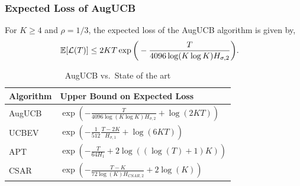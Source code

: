 \begin{frame}
\frametitle{Expected Loss of AugUCB}

\begin{theorem}
For $K\geq 4$ and $\rho={1}/{3}$,
the expected loss of the AugUCB algorithm is given by,
\begin{align*}
\mathbb{E}[\mathcal{L}(T)]
& \leq 2KT \exp\bigg(- \frac{T}{4096 \log( K\log K) H_{\sigma,2}} \bigg).
\end{align*}
\end{theorem}


\begin{table}[b]
\caption{AugUCB vs.\ State of the art}
\label{tab:regret-bds}
\begin{center}
\begin{tabular}{|p{1.5cm}|p{6.4cm}|}
\hline
Algorithm  & Upper Bound on Expected Loss \\
\hline
AugUCB      &$ \exp\left(- \frac{T}{4096 \log(K\log K)H_{\sigma,2}} + \log\left(2KT\right) \right) $ \\
\hline
UCBEV		&$\exp\left(-\frac{1}{512}\frac{T-2K}{H_{\sigma,1}} + \log\left(6KT\right)\right)$ \\
\hline
APT         &$\exp\left(-\frac{T}{64 H_1}+2\log((\log(T)+1)K)\right)$ \\
\hline
CSAR		&$\exp\left(-\frac{T-K}{72\log(K)H_{CSAR,2}}+2\log(K)\right)$ \\
\hline

\end{tabular}
\end{center}
\end{table}
\end{frame}

%
%

